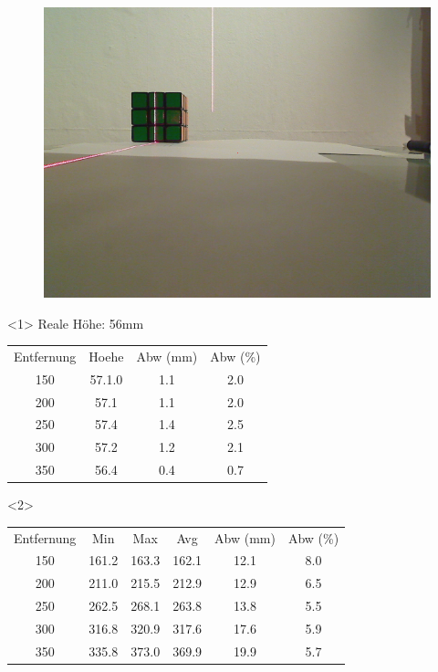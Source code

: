 \documentclass[xcolor=dvipsnames]{beamer}
\begin{document}
\begin{frame}
\begin{figure}
\begin{minipage}{0.32\linewidth}
		\end{minipage}
		\hfill
		\begin{minipage}{0.32\linewidth}
			\includegraphics[width=\linewidth]{includes/test_dist_3}
		\end{minipage}
	\end{figure}

	\begin{onlyenv}
		Reale Höhe: 56mm
		\begin{tabular}{c|c|c|c}
			Entfernung & Hoehe & Abw (mm) & Abw (\%) \\
			150 & 57.1.0 & 1.1 & 2.0\\
			200 & 57.1 & 1.1 & 2.0\\
			250 & 57.4 & 1.4 & 2.5\\
			300 & 57.2 & 1.2 & 2.1\\
			350 & 56.4 & 0.4 & 0.7
		\end{tabular}
	\end{onlyenv}
	\begin{onlyenv}
		\begin{tabular}{c|c|c|c|c|c}
			Entfernung & Min & Max & Avg & Abw (mm) & Abw (\%)\\
			150 & 161.2 & 163.3 & 162.1 & 12.1 & 8.0\\
			200 & 211.0 & 215.5 & 212.9 & 12.9 & 6.5\\
			250 & 262.5 & 268.1 & 263.8 & 13.8 & 5.5\\
			300 & 316.8 & 320.9 & 317.6 & 17.6 & 5.9\\
			350 & 335.8 & 373.0 & 369.9 & 19.9 & 5.7
		\end{tabular}
	\end{onlyenv}

\end{frame}
\end{document}
